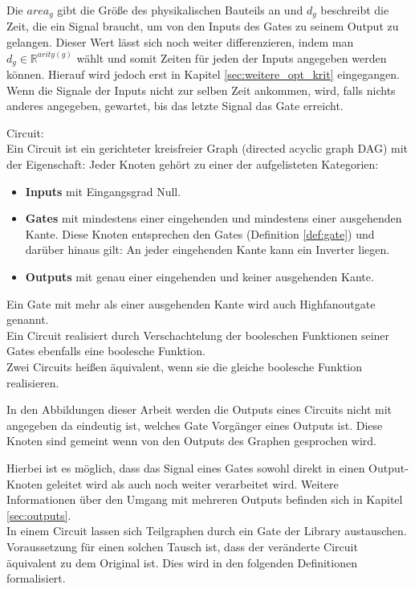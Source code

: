 \documentclass[11pt, a4paper, german]{article}
\begin{document}
Die $area_g$ gibt die Größe des physikalischen Bauteils an und $d_g$ beschreibt die Zeit, die ein Signal braucht, um von den Inputs des Gates zu seinem Output zu gelangen. Dieser Wert lässt sich noch weiter differenzieren, indem man $d_g \in \mathbb{R}^{arity(g)}$ wählt und somit Zeiten für jeden der Inputs angegeben werden können. Hierauf wird jedoch erst in Kapitel \ref{sec:weitere_opt_krit} eingegangen. \\
Wenn die Signale der Inputs nicht zur selben Zeit ankommen, wird, falls nichts anderes angegeben, gewartet, bis das letzte Signal das Gate erreicht.

\begin{definition}{Circuit:}\\
Ein Circuit ist ein gerichteter kreisfreier Graph (directed acyclic graph DAG) mit der Eigenschaft: Jeder Knoten gehört zu einer der aufgelisteten Kategorien: 
\begin{itemize}
\item {\bf Inputs }mit Eingangsgrad Null.
\item{\bf Gates} mit mindestens einer eingehenden und mindestens einer ausgehenden Kante.
Diese Knoten entsprechen den Gates (Definition \ref{def:gate}) und darüber hinaus gilt: An jeder eingehenden Kante kann ein Inverter liegen.
\item{\bf Outputs} mit genau einer eingehenden und keiner ausgehenden Kante.
\end{itemize}
Ein Gate mit mehr als einer ausgehenden Kante wird auch Highfanoutgate genannt.\\
Ein Circuit realisiert durch Verschachtelung der booleschen Funktionen seiner Gates ebenfalls eine boolesche Funktion. \\
Zwei Circuits heißen äquivalent, wenn sie die gleiche boolesche Funktion realisieren.
\end{definition}

In den Abbildungen dieser Arbeit werden die Outputs eines Circuits nicht mit angegeben da eindeutig ist, welches Gate Vorgänger eines Outputs ist. Diese Knoten sind gemeint wenn von den Outputs des Graphen gesprochen wird. 

Hierbei ist es möglich, dass das Signal eines Gates sowohl direkt in einen Output-Knoten geleitet wird als auch noch weiter verarbeitet wird. Weitere Informationen über den Umgang mit mehreren Outputs befinden sich in Kapitel \ref{sec:outputs}.\\
In einem Circuit lassen sich Teilgraphen durch ein Gate der Library austauschen. Voraussetzung für einen solchen Tausch ist, dass der veränderte Circuit äquivalent zu dem Original ist. Dies wird in den folgenden Definitionen formalisiert. 
\end{document}
